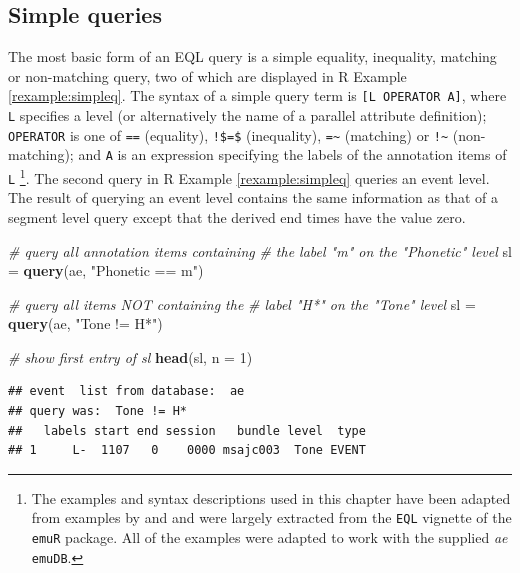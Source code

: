 \documentclass[]{book}
\newenvironment{Shaded}{\begin{snugshade}}{\end{snugshade}}
\newcommand{\CommentTok}[1]{\textcolor[rgb]{0.56,0.35,0.01}{\textit{#1}}}
\newcommand{\DataTypeTok}[1]{\textcolor[rgb]{0.13,0.29,0.53}{#1}}
\newcommand{\DecValTok}[1]{\textcolor[rgb]{0.00,0.00,0.81}{#1}}
\newcommand{\KeywordTok}[1]{\textcolor[rgb]{0.13,0.29,0.53}{\textbf{#1}}}
\newcommand{\NormalTok}[1]{#1}
\newcommand{\StringTok}[1]{\textcolor[rgb]{0.31,0.60,0.02}{#1}}
\let\rmarkdownfootnote\footnote%
\def\footnote{\protect\rmarkdownfootnote}
\theoremstyle{definition}
\theoremstyle{definition}
\theoremstyle{definition}
\theoremstyle{remark}
\begin{document}
\hypertarget{simple-queries}{%
\subsection{Simple queries}\label{simple-queries}}

The most basic form of an EQL query is a simple equality, inequality,
matching or non-matching query, two of which are displayed in R Example
\ref{rexample:simpleq}. The syntax of a simple query term is
\texttt{{[}L\ OPERATOR\ A{]}}, where \texttt{L} specifies a level (or
alternatively the name of a parallel attribute definition);
\texttt{OPERATOR} is one of \texttt{==} (equality), \texttt{!\$=\$}
(inequality), \texttt{=\textasciitilde{}} (matching) or
\texttt{!\textasciitilde{}} (non-matching); and \texttt{A} is an
expression specifying the labels of the annotation items of \texttt{L}
\footnote{The examples and syntax descriptions used in this chapter have
  been adapted from examples by \citet{cassidy:sc2001a} and
  \citet{harrington:2002aa} and were largely extracted from the
  \texttt{EQL} vignette of the \texttt{emuR} package. All of the
  examples were adapted to work with the supplied \emph{ae}
  \texttt{emuDB}.}. The second query in R Example \ref{rexample:simpleq}
queries an event level. The result of querying an event level contains
the same information as that of a segment level query except that the
derived end times have the value zero.

\begin{Shaded}
\begin{Highlighting}[]
\CommentTok{# query all annotation items containing}
\CommentTok{# the label "m" on the "Phonetic" level}
\NormalTok{sl =}\StringTok{ }\KeywordTok{query}\NormalTok{(ae, }\StringTok{"Phonetic == m"}\NormalTok{)}

\CommentTok{# query all items NOT containing the}
\CommentTok{# label "H*" on the "Tone" level}
\NormalTok{sl =}\StringTok{ }\KeywordTok{query}\NormalTok{(ae, }\StringTok{"Tone != H*"}\NormalTok{)}

\CommentTok{# show first entry of sl}
\KeywordTok{head}\NormalTok{(sl, }\DataTypeTok{n =} \DecValTok{1}\NormalTok{)}
\end{Highlighting}
\end{Shaded}

\begin{verbatim}
## event  list from database:  ae 
## query was:  Tone != H* 
##   labels start end session   bundle level  type
## 1     L-  1107   0    0000 msajc003  Tone EVENT
\end{verbatim}
\end{document}

